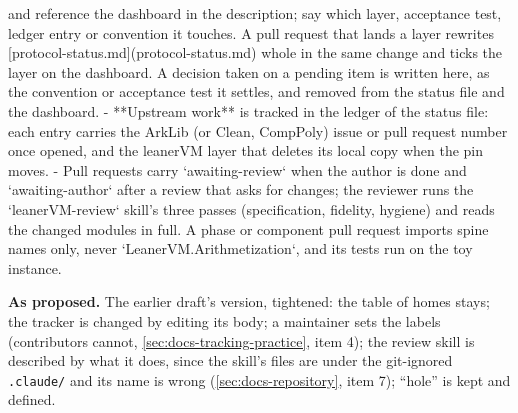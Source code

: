 \begin{srccode}
  and reference the dashboard in the description; say which layer, acceptance test, ledger entry
  or convention it touches. A pull request that lands a layer rewrites
  [protocol-status.md](protocol-status.md) whole in the same change and ticks the layer on the
  dashboard. A decision taken on a pending item is written here, as the convention or
  acceptance test it settles, and removed from the status file and the dashboard.
- **Upstream work** is tracked in the ledger of the status file: each entry carries the ArkLib
  (or Clean, CompPoly) issue or pull request number once opened, and the leanerVM layer that
  deletes its local copy when the pin moves.
- Pull requests carry `awaiting-review` when the author is done and `awaiting-author` after a
  review that asks for changes; the reviewer runs the `leanerVM-review` skill's three passes
  (specification, fidelity, hygiene) and reads the changed modules in full. A phase or component
  pull request imports spine names only, never `LeanerVM.Arithmetization`, and its tests run on
  the toy instance.
\end{srccode}

\begin{sloppypar}
\textbf{As proposed.} The earlier draft's version, tightened: the table of homes stays; the tracker is changed by editing its body; a maintainer sets the labels (contributors cannot, \cref{sec:docs-tracking-practice}, item 4); the review skill is described by what it does, since the skill's files are under the git-ignored \texttt{.\allowbreak{}claude/\allowbreak{}} and its name is wrong (\cref{sec:docs-repository}, item 7); ``hole'' is kept and defined.
\end{sloppypar}


